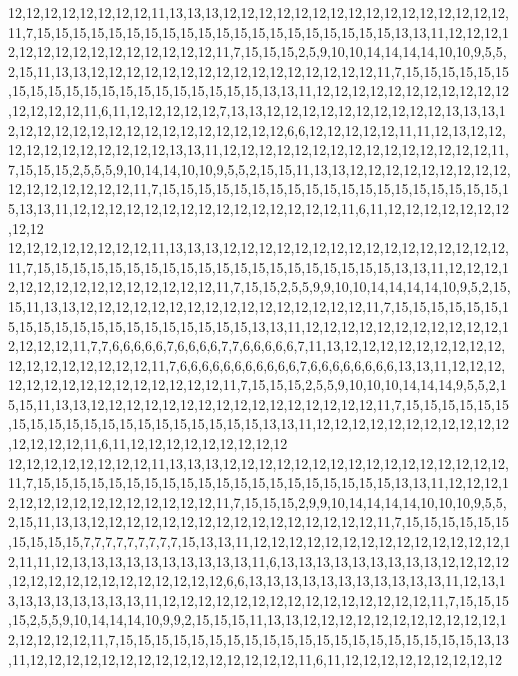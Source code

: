 12,12,12,12,12,12,12,12,11,13,13,13,12,12,12,12,12,12,12,12,12,12,12,12,12,12,12,12,11,7,15,15,15,15,15,15,15,15,15,15,15,15,15,15,15,15,15,15,15,15,13,13,11,12,12,12,12,12,12,12,12,12,12,12,12,12,12,12,11,7,15,15,15,2,5,9,10,10,14,14,14,14,10,10,9,5,5,2,15,11,13,13,12,12,12,12,12,12,12,12,12,12,12,12,12,12,12,12,11,7,15,15,15,15,15,15,15,15,15,15,15,15,15,15,15,15,15,15,15,15,13,13,11,12,12,12,12,12,12,12,12,12,12,12,12,12,12,12,11,6,11,12,12,12,12,12,7,13,13,12,12,12,12,12,12,12,12,12,12,13,13,13,12,12,12,12,12,12,12,12,12,12,12,12,12,12,12,12,6,6,12,12,12,12,12,11,11,12,13,12,12,12,12,12,12,12,12,12,12,12,13,13,11,12,12,12,12,12,12,12,12,12,12,12,12,12,12,12,11,7,15,15,15,2,5,5,5,9,10,14,14,10,10,9,5,5,2,15,15,11,13,13,12,12,12,12,12,12,12,12,12,12,12,12,12,12,12,12,11,7,15,15,15,15,15,15,15,15,15,15,15,15,15,15,15,15,15,15,15,15,13,13,11,12,12,12,12,12,12,12,12,12,12,12,12,12,12,12,11,6,11,12,12,12,12,12,12,12,12,12
12,12,12,12,12,12,12,12,11,13,13,13,12,12,12,12,12,12,12,12,12,12,12,12,12,12,12,12,11,7,15,15,15,15,15,15,15,15,15,15,15,15,15,15,15,15,15,15,15,15,13,13,11,12,12,12,12,12,12,12,12,12,12,12,12,12,12,12,11,7,15,15,2,5,5,9,9,10,10,14,14,14,14,10,9,5,2,15,15,11,13,13,12,12,12,12,12,12,12,12,12,12,12,12,12,12,12,12,11,7,15,15,15,15,15,15,15,15,15,15,15,15,15,15,15,15,15,15,15,15,13,13,11,12,12,12,12,12,12,12,12,12,12,12,12,12,12,12,11,7,7,6,6,6,6,6,7,6,6,6,6,7,7,6,6,6,6,6,7,11,13,12,12,12,12,12,12,12,12,12,12,12,12,12,12,12,12,12,11,7,6,6,6,6,6,6,6,6,6,6,6,7,6,6,6,6,6,6,6,6,13,13,11,12,12,12,12,12,12,12,12,12,12,12,12,12,12,12,11,7,15,15,15,2,5,5,9,10,10,10,14,14,14,9,5,5,2,15,15,11,13,13,12,12,12,12,12,12,12,12,12,12,12,12,12,12,12,12,11,7,15,15,15,15,15,15,15,15,15,15,15,15,15,15,15,15,15,15,15,15,13,13,11,12,12,12,12,12,12,12,12,12,12,12,12,12,12,12,11,6,11,12,12,12,12,12,12,12,12,12
12,12,12,12,12,12,12,12,11,13,13,13,12,12,12,12,12,12,12,12,12,12,12,12,12,12,12,12,11,7,15,15,15,15,15,15,15,15,15,15,15,15,15,15,15,15,15,15,15,15,13,13,11,12,12,12,12,12,12,12,12,12,12,12,12,12,12,12,11,7,15,15,15,2,9,9,10,14,14,14,14,10,10,10,9,5,5,2,15,11,13,13,12,12,12,12,12,12,12,12,12,12,12,12,12,12,12,12,11,7,15,15,15,15,15,15,15,15,15,15,7,7,7,7,7,7,7,7,7,15,13,13,11,12,12,12,12,12,12,12,12,12,12,12,12,12,12,12,11,11,12,13,13,13,13,13,13,13,13,13,13,11,6,13,13,13,13,13,13,13,13,13,12,12,12,12,12,12,12,12,12,12,12,12,12,12,12,12,6,6,13,13,13,13,13,13,13,13,13,13,13,11,12,13,13,13,13,13,13,13,13,13,11,12,12,12,12,12,12,12,12,12,12,12,12,12,12,12,11,7,15,15,15,15,2,5,5,9,10,14,14,14,10,9,9,2,15,15,15,11,13,13,12,12,12,12,12,12,12,12,12,12,12,12,12,12,12,12,11,7,15,15,15,15,15,15,15,15,15,15,15,15,15,15,15,15,15,15,15,15,13,13,11,12,12,12,12,12,12,12,12,12,12,12,12,12,12,12,11,6,11,12,12,12,12,12,12,12,12,12
